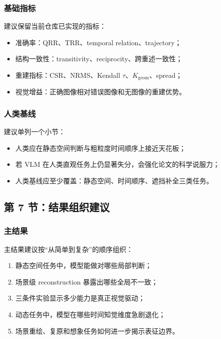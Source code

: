 \documentclass[UTF8,12pt,fontset=none]{ctexart}
\begin{document}
\subsubsection{基础指标}
建议保留当前仓库已实现的指标：
\begin{itemize}
  \item 准确率：QRR、TRR、temporal relation、trajectory；
  \item 结构一致性：transitivity、reciprocity、跨重述一致性；
  \item 重建指标：CSR、NRMS、Kendall $\tau$、$K_{\text{geom}}$、spread；
  \item 视觉增益：正确图像相对错误图像和无图像的重建优势。
\end{itemize}

\subsubsection{人类基线}
建议单列一个小节：
\begin{itemize}
  \item 人类应在静态空间判断与粗粒度时间顺序上接近天花板；
  \item 若 VLM 在人类直观任务上仍显著失分，会强化论文的科学说服力；
  \item 人类基线应至少覆盖：静态空间、时间顺序、遮挡补全三类任务。
\end{itemize}

\subsection{第 7 节：结果组织建议}

\subsubsection{主结果}
主结果建议按“从简单到复杂”的顺序组织：
\begin{enumerate}
  \item 静态空间任务中，模型能做对哪些局部判断；
  \item 场景级 reconstruction 暴露出哪些全局不一致；
  \item 三条件实验显示多少能力是真正视觉驱动；
  \item 动态任务中，模型在哪些时间知觉维度急剧退化；
  \item 场景重绘、复原和想象任务如何进一步揭示表征边界。
\end{enumerate}
\end{document}
